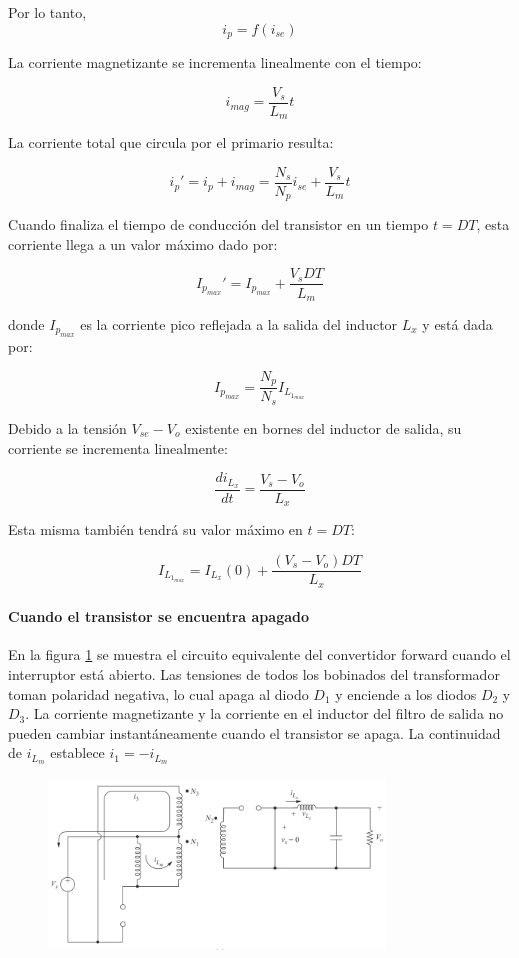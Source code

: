 Por lo tanto, 
$$ i_p=f(i_{se}) $$

La corriente magnetizante se incrementa linealmente con el tiempo:

$$ i_{mag}=\frac{V_s}{L_m}t $$

La corriente total que circula por el primario resulta:

$$ i_p'=i_p+i_{mag}=\frac{N_s}{N_p}i_{se}+\frac{V_s}{L_m}t $$

Cuando finaliza el tiempo de conducción del transistor en un tiempo $t=DT$, esta corriente llega a un valor máximo dado por:

$$ I_{p_{max}}'=I_{p_{max}}+\frac{V_sDT}{L_m} $$

donde $I_{p_{max}}$ es la corriente pico reflejada a la salida del inductor $L_x$ y está dada por:

$$ I_{p_{max}}=\frac{N_p}{N_s}I_{L_{1_{max}}} $$

Debido a la tensión $V_{se}-V_o$ existente en bornes del inductor de salida, su corriente se incrementa linealmente:

$$ \frac{di_{L_x}}{dt}=\frac{V_s-V_o}{L_x} $$

Esta misma también tendrá su valor máximo en $t=DT$:

$$ I_{L_{1_{max}}}=I_{L_x}(0)+\frac{(V_s-V_o)DT}{L_x} $$

\paragraph{Cuando el transistor se encuentra apagado}
En la figura \ref{fig:forward_switch_open} se muestra el circuito equivalente del convertidor forward cuando el interruptor está abierto. 
Las tensiones de todos los bobinados del transformador toman polaridad negativa, lo cual apaga al diodo $D_1$ y enciende a los diodos $D_2$ y $D_3$. 
La corriente magnetizante y la corriente en el inductor del filtro de salida no pueden cambiar instantáneamente cuando el transistor se apaga. 
La continuidad de $i_{L_m}$ establece $ i_1=-i_{L_m} $

\begin{figure}[ht]
    \centering
    \includegraphics[width=0.8\textwidth]{../images/hart/forward_switch_open.png}
    \caption{}
    \label{fig:forward_switch_open}
\end{figure}

